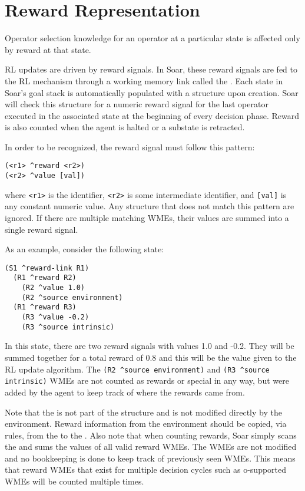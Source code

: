 \section{Reward Representation}
\label{RL-reward}

Operator selection knowledge for an operator at a particular state is affected only by reward at that state.

RL updates are driven by reward signals.
In Soar, these reward signals are fed to the RL mechanism through a working memory link called the .
Each state in Soar's goal stack is automatically populated with a  structure upon creation.
Soar will check this structure for a numeric reward signal for the last operator executed in the associated state at the beginning of every decision phase.
Reward is also counted when the agent is halted or a substate is retracted.

In order to be recognized, the reward signal must follow this pattern:

\begin{verbatim}
(<r1> ^reward <r2>)
(<r2> ^value [val])
\end{verbatim}

where \verb=<r1>= is the  identifier, \verb=<r2>= is some intermediate identifier, and \verb=[val]= is any constant numeric value.
Any structure that does not match this pattern are ignored.
If there are multiple matching WMEs, their values are summed into a single reward signal.

As an example, consider the following state:

\begin{verbatim}
(S1 ^reward-link R1)
  (R1 ^reward R2)
    (R2 ^value 1.0)
    (R2 ^source environment)
  (R1 ^reward R3)
    (R3 ^value -0.2)
    (R3 ^source intrinsic)
\end{verbatim}  

In this state, there are two reward signals with values 1.0 and -0.2.
They will be summed together for a total reward of 0.8 and this will be the value given to the RL update algorithm.
The \verb=(R2 ^source environment)= and \verb=(R3 ^source intrinsic)= WMEs are not counted as rewards or special in any way, but were added by the agent to keep track of where the rewards came from.

Note that the  is not part of the  structure and is not modified directly by the environment.
Reward information from the environment should be copied, via rules, from the  to the .
Also note that when counting rewards, Soar simply scans the  and sums the values of all valid reward WMEs.
The WMEs are not modified and no bookkeeping is done to keep track of previously seen WMEs.
This means that reward WMEs that exist for multiple decision cycles such as o-supported WMEs will be counted multiple times.

